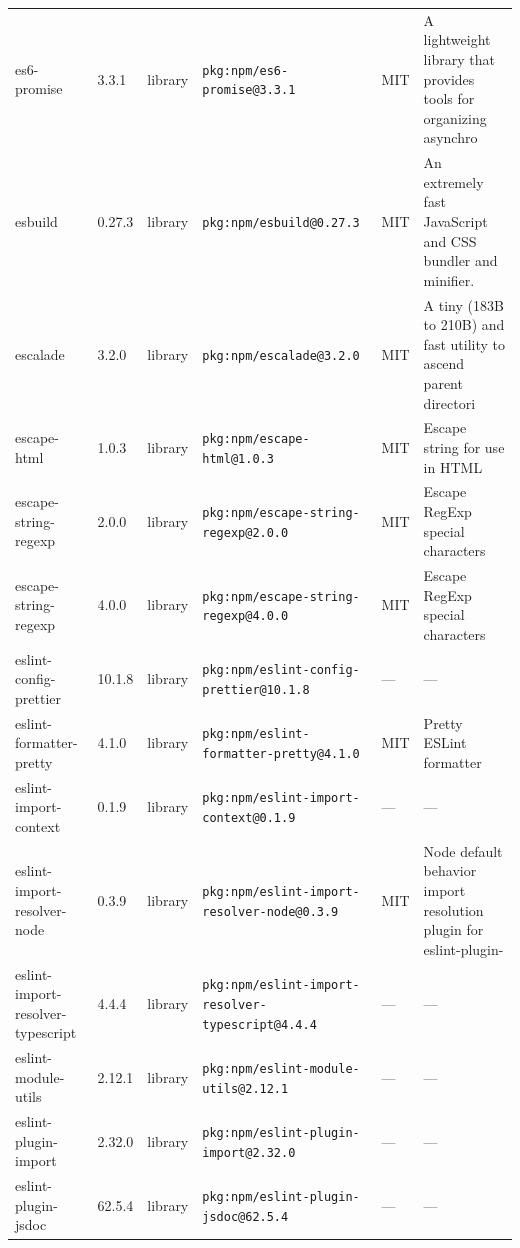 \documentclass[11pt,a4paper]{article}
\begin{document}
\begin{longtable}{|p{4cm}|p{2cm}|p{1.6cm}|p{5cm}|p{1.5cm}|p{3.5cm}|}
\raggedright es6-promise & 3.3.1 & library & \small\texttt{pkg:npm/es6-promise@3.3.1} & MIT & \small A lightweight library that provides tools for organizing asynchro \\
\raggedright esbuild & 0.27.3 & library & \small\texttt{pkg:npm/esbuild@0.27.3} & MIT & \small An extremely fast JavaScript and CSS bundler and minifier. \\
\raggedright escalade & 3.2.0 & library & \small\texttt{pkg:npm/escalade@3.2.0} & MIT & \small A tiny (183B to 210B) and fast utility to ascend parent directori \\
\raggedright escape-html & 1.0.3 & library & \small\texttt{pkg:npm/escape-html@1.0.3} & MIT & \small Escape string for use in HTML \\
\raggedright escape-string-regexp & 2.0.0 & library & \small\texttt{pkg:npm/escape-string-regexp@2.0.0} & MIT & \small Escape RegExp special characters \\
\raggedright escape-string-regexp & 4.0.0 & library & \small\texttt{pkg:npm/escape-string-regexp@4.0.0} & MIT & \small Escape RegExp special characters \\
\raggedright eslint-config-prettier & 10.1.8 & library & \small\texttt{pkg:npm/eslint-config-prettier@10.1.8} & — & \small — \\
\raggedright eslint-formatter-pretty & 4.1.0 & library & \small\texttt{pkg:npm/eslint-formatter-pretty@4.1.0} & MIT & \small Pretty ESLint formatter \\
\raggedright eslint-import-context & 0.1.9 & library & \small\texttt{pkg:npm/eslint-import-context@0.1.9} & — & \small — \\
\raggedright eslint-import-resolver-node & 0.3.9 & library & \small\texttt{pkg:npm/eslint-import-resolver-node@0.3.9} & MIT & \small Node default behavior import resolution plugin for eslint-plugin- \\
\raggedright eslint-import-resolver-typescript & 4.4.4 & library & \small\texttt{pkg:npm/eslint-import-resolver-typescript@4.4.4} & — & \small — \\
\raggedright eslint-module-utils & 2.12.1 & library & \small\texttt{pkg:npm/eslint-module-utils@2.12.1} & — & \small — \\
\raggedright eslint-plugin-import & 2.32.0 & library & \small\texttt{pkg:npm/eslint-plugin-import@2.32.0} & — & \small — \\
\raggedright eslint-plugin-jsdoc & 62.5.4 & library & \small\texttt{pkg:npm/eslint-plugin-jsdoc@62.5.4} & — & \small — \\

\end{longtable}
\end{document}
